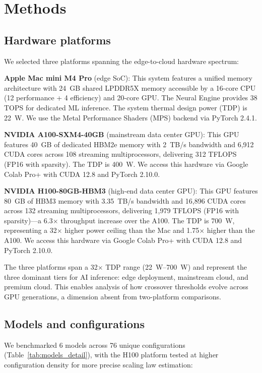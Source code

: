 \documentclass[11pt]{article}
\begin{document}
\section{Methods}

\subsection{Hardware platforms}

We selected three platforms spanning the edge-to-cloud hardware spectrum:

\textbf{Apple Mac mini M4 Pro} (edge SoC): This system features a unified memory architecture with 24~GB shared LPDDR5X memory accessible by a 16-core CPU (12 performance + 4 efficiency) and 20-core GPU. The Neural Engine provides 38 TOPS for dedicated ML inference. The system thermal design power (TDP) is 22~W. We use the Metal Performance Shaders (MPS) backend via PyTorch 2.4.1.

\textbf{NVIDIA A100-SXM4-40GB} (mainstream data center GPU): This GPU features 40~GB of dedicated HBM2e memory with 2~TB/s bandwidth and 6,912 CUDA cores across 108 streaming multiprocessors, delivering 312 TFLOPS (FP16 with sparsity). The TDP is 400~W. We access this hardware via Google Colab Pro+ with CUDA 12.8 and PyTorch 2.10.0.

\textbf{NVIDIA H100-80GB-HBM3} (high-end data center GPU): This GPU features 80~GB of HBM3 memory with 3.35~TB/s bandwidth and 16,896 CUDA cores across 132 streaming multiprocessors, delivering 1,979 TFLOPS (FP16 with sparsity)---a 6.3$\times$ throughput increase over the A100. The TDP is 700~W, representing a 32$\times$ higher power ceiling than the Mac and 1.75$\times$ higher than the A100. We access this hardware via Google Colab Pro+ with CUDA 12.8 and PyTorch 2.10.0.

The three platforms span a 32$\times$ TDP range (22~W--700~W) and represent the three dominant tiers for AI inference: edge deployment, mainstream cloud, and premium cloud. This enables analysis of how crossover thresholds evolve across GPU generations, a dimension absent from two-platform comparisons.

\subsection{Models and configurations}

We benchmarked 6 models across 76 unique configurations (Table~\ref{tab:models_detail}), with the H100 platform tested at higher configuration density for more precise scaling law estimation:
\end{document}
